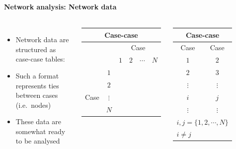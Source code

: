 \documentclass[8pt]{beamer}
\begin{document}

\begin{frame}[fragile]
\frametitle{\insertsection}
\framesubtitle{Network analysis: Network data}


\begin{columns}[c]

\begin{minipage}[c][.5\textheight][c]{\linewidth}

\begin{itemize}
\item Network data are structured as case-case tables: {\color{blue}{matrices or lists}} 
\item Such a format represents ties between cases (i.e.\ nodes)
\item These data are somewhat ready to be analysed
\end{itemize}

\end{minipage}	   


\begin{minipage}[c][.5\textheight][c]{\linewidth}

\footnotesize
\centering
\begin{tabular}{lccccc}
\multicolumn{6}{c}{Case-case {\color{blue}{adjacency matrix}}}\\
\toprule
        &        &\multicolumn{4}{c}{Case}\\
 
        &        & $1$ & $2$ & $\cdots$ & $N$\\
\hline
        &    $1$           \\
        &    $2$           \\
Case    &    $\vdots$      \\
        &    $N$           \\
\bottomrule
\end{tabular}


\medskip
\medskip
\medskip

\begin{tabular}{cc}
\multicolumn{2}{c}{Case-case {\color{blue}{list}}}\\
\toprule
Case  & Case\\
\hline
$1$           & $2$          \\
$2$           & $3$    \\
$\vdots$      & $\vdots$    \\
$i$           & $j$    \\
$\vdots$      & $\vdots$    \\
\bottomrule
\multicolumn{2}{l}{\tiny $i, j = \{1, 2, \cdots, N\}$}\\
\multicolumn{2}{l}{\tiny $i \ne j$}
\end{tabular}


\end{minipage}

\end{columns}


\end{frame}
\end{document}
